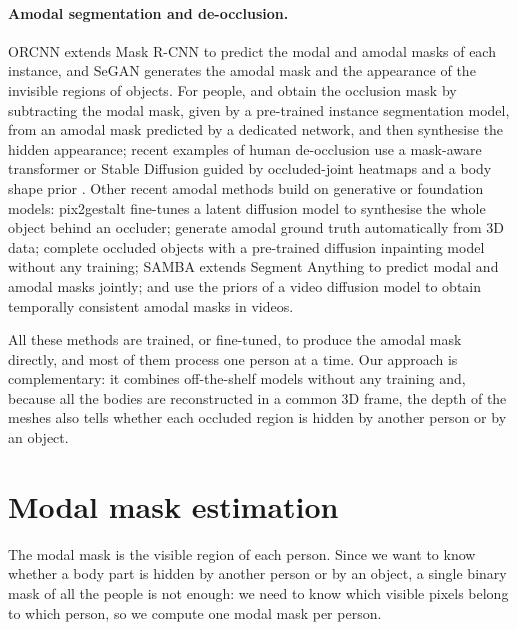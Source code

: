 \documentclass[pdflatex,sn-mathphys-num]{sn-jnl}%
\begin{document}
\paragraph{Amodal segmentation and de-occlusion.} ORCNN \citep{orcnn} extends Mask R-CNN to predict the modal and amodal masks of each instance, and SeGAN \citep{SeGAN} generates the amodal mask and the appearance of the invisible regions of objects. For people, \citet{sym14030531} and \citet{AHPdataset} obtain the occlusion mask by subtracting the modal mask, given by a pre-trained instance segmentation model, from an amodal mask predicted by a dedicated network, and then synthesise the hidden appearance; recent examples of human de-occlusion use a mask-aware transformer \citep{liang2024dmat} or Stable Diffusion guided by occluded-joint heatmaps and a body shape prior \citep{noh2025sddeocclusion}. Other recent amodal methods build on generative or foundation models: pix2gestalt \citep{ozguroglu2024pix2gestalt} fine-tunes a latent diffusion model to synthesise the whole object behind an occluder; \citet{zhan2024amodal} generate amodal ground truth automatically from 3D data; \citet{xu2024amodal} complete occluded objects with a pre-trained diffusion inpainting model without any training; SAMBA \citep{liu2025samba} extends Segment Anything to predict modal and amodal masks jointly; and \citet{chen2025diffvas} use the priors of a video diffusion model to obtain temporally consistent amodal masks in videos.

All these methods are trained, or fine-tuned, to produce the amodal mask directly, and most of them process one person at a time. Our approach is complementary: it combines off-the-shelf models without any training and, because all the bodies are reconstructed in a common 3D frame, the depth of the meshes also tells whether each occluded region is hidden by another person or by an object.

\section{Modal mask estimation}
\label{section:modal}
The modal mask is the visible region of each person. Since we want to know whether a body part is hidden by another person or by an object, a single binary mask of all the people is not enough: we need to know which visible pixels belong to which person, so we compute one modal mask per person.
\end{document}
